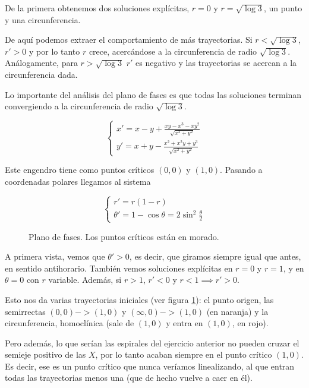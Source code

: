\begin{example}
De la primera obtenemos dos soluciones explícitas, $r=0$ y $r=\sqrt{\log 3}$, un punto y una circunferencia.

De aquí podemos extraer el comportamiento de más trayectorias. Si $r<\sqrt{\log 3}$, $r'>0$ y por lo tanto $r$ crece, acercándose a la circunferencia de radio $\sqrt{\log 3}$. Análogamente, para $r > \sqrt{\log 3}$ $r'$ es negativo y las trayectorias se acercan a la circunferencia dada.

Lo importante del análisis del plano de fases es que todas las soluciones terminan convergiendo a la circunferencia de radio $\sqrt{\log 3}$.
\end{example}

\begin{example}
\[ \begin{cases}
x' = x-y+\frac{xy-x^3-xy^2}{\sqrt{x^2+y^2}} \\
y' = x+y - \frac{x^2+x^2y+y^3}{\sqrt{x^2+y^2}}
\end{cases} \]

Este engendro tiene como puntos críticos $(0,0)$ y $(1,0)$. Pasando a coordenadas polares llegamos al sistema

\[ \begin{cases}
r' = r(1-r) \\
θ' = 1-\cos θ = 2\sin^2 \frac{θ}{2}
\end{cases} \]

\begin{figure}
\label{img8-Ej5}
\caption{Plano de fases. Los puntos críticos están en morado.}
\end{figure}

A primera vista, vemos que $θ' > 0$, es decir, que giramos siempre igual que antes, en sentido antihorario. También vemos soluciones explícitas en $r=0$ y $r=1$, y en $θ=0$ con $r$ variable. Además, si $r > 1$, $r'<0$ y $r<1 \implies r' > 0$.

Esto nos da varias trayectorias iniciales (ver figura \ref{img8-Ej5}): el punto origen, las semirrectas $(0,0) -> (1,0)$ y $(∞,0) -> (1,0)$ (en naranja) y la circunferencia, homoclínica (sale de $(1,0)$ y entra en $(1,0)$, en rojo).

Pero además, lo que serían las espirales del ejercicio anterior no pueden cruzar el semieje positivo de las $X$, por lo tanto acaban siempre en el punto crítico $(1,0)$. Es decir, ese es un punto crítico que nunca veríamos linealizando, al que entran todas las trayectorias menos una (que de hecho vuelve a caer en él).
\end{example}

